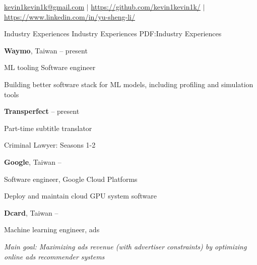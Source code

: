 \documentclass[letterpaper,MMMyyyy,nonstopmode]{simpleresumecv}
\newcommand{\CVAuthor}{Yu-Sheng (Kevin) Li}
\newcommand{\CVWebpage}{https://kevin1kevin1k.github.io/}
\newcommand{\GHWebpage}{https://github.com/kevin1kevin1k/}
\newcommand{\LIWebpage}{https://www.linkedin.com/in/yu-sheng-li/}
\begin{document}


\Title{\CVAuthor}

\BigGap

\begin{SubTitle}
\faEnvelope \; \href{mailto:kevin1kevin1k@gmail.com}{kevin1kevin1k@gmail.com}
\; $|$ \;
\faGithub \; \href{\GHWebpage}{\url{\GHWebpage}}
\; $|$ \;
\faLinkedin \; \href{\LIWebpage}{\url{\LIWebpage}}
\end{SubTitle}

\begin{Body}

\large


\BigGap

\Section
{Industry Experiences}
{Industry Experiences}
{PDF:Industry Experiences}



\Entry
\textbf{Waymo}, Taiwan
\hfill
{} -- present

\Gap
\BulletItem
ML tooling Software engineer

\SubBulletItem
Building better software stack for ML models, including profiling and simulation tools


\BigGap


\Entry
\textbf{Transperfect}
\hfill
{} -- present

\Gap
\BulletItem
Part-time subtitle translator

 Criminal Lawyer: Seasons 1-2


\BigGap



\Entry
\textbf{Google}, Taiwan
\hfill
{} -- 

\Gap
\BulletItem
Software engineer, Google Cloud Platforms

\SubBulletItem
Deploy and maintain cloud GPU system software


\BigGap


\Entry
\textbf{Dcard}, Taiwan
\hfill
{} -- 

\Gap
\BulletItem
Machine learning engineer, ads

\SubBulletItem
\textit{Main goal: Maximizing ads revenue (with advertiser constraints) by optimizing online ads recommender systems}


\end{Body}
\end{document}
